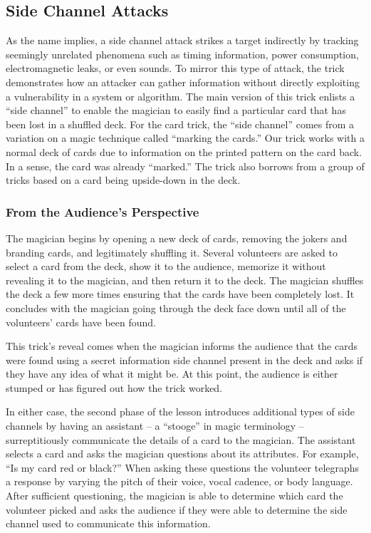 \subsection{Side Channel Attacks}

As the name implies, a side channel attack strikes a target indirectly
by tracking seemingly unrelated phenomena
such as timing information, power consumption, electromagnetic leaks, or even
sounds.  To mirror this type of attack, the trick
demonstrates how an attacker can
gather information without directly exploiting
a vulnerability in a system or algorithm.
The main version of this trick enlists a ``side channel'' to
enable the magician to easily
find a particular card that has been lost in a shuffled deck.
For the card trick, the ``side channel'' comes from a variation on a magic
technique called ``marking the cards.''  Our trick works with a normal deck
of cards due to information on the printed pattern on the card back.  In a
sense, the card was already ``marked.''  The trick also borrows from a
group of tricks based on a card being upside-down in the deck.

\subsubsection{From the Audience's Perspective}

The magician begins by opening a new deck of cards, removing the jokers and
branding cards, and legitimately shuffling it.  Several volunteers are
asked to
select a card from the deck, show it to the audience, memorize it without
revealing it to the magician, and then return it to the deck.
The magician shuffles the deck a few more times ensuring that the cards
have
been completely lost.
It concludes with the magician going through the deck face down
until all of the volunteers' cards have been found.

This trick's reveal comes when the magician informs the audience
that the cards were found using a secret
information side channel present in the
deck and asks if they have any idea of what it might be.
At this point, the audience is either stumped or has figured out how the trick
worked.

In either case,  the second phase of the lesson
introduces additional types of side channels
by having an assistant
-- a ``stooge'' in magic terminology --
surreptitiously
communicate the details of a card
to the magician.
The assistant selects a card and asks the magician questions about its
attributes.
For example, ``Is my card red or black?''
When asking these questions the volunteer
telegraphs a response
by varying the pitch of their voice, vocal cadence, or body language.
After sufficient questioning, the magician is able to determine which card the
volunteer picked and asks the audience if they were able to determine the side
channel used to communicate this information.

